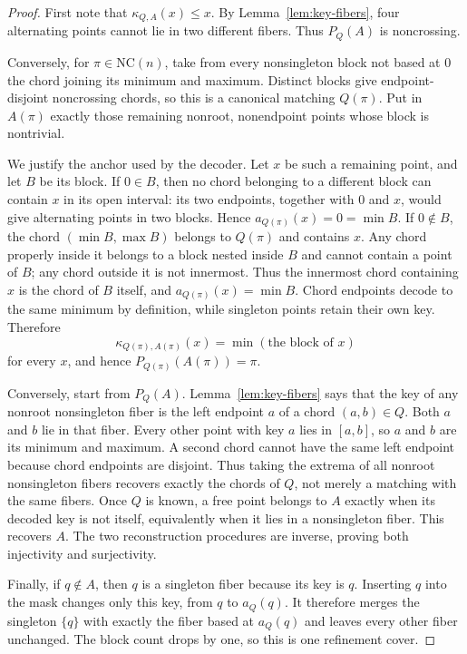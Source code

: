 \documentclass[12pt]{article}
\newcommand{\NC}{\mathrm{NC}}
\begin{document}
\begin{proof}
First note that $\kappa_{Q,A}(x)\leq x$.  By
Lemma~\ref{lem:key-fibers}, four alternating points cannot lie in two
different fibers.  Thus $P_Q(A)$ is noncrossing.

Conversely, for $\pi\in\NC(n)$, take from every nonsingleton block not based
at $0$ the chord joining its minimum and maximum.  Distinct blocks give
endpoint-disjoint noncrossing chords, so this is a canonical matching
$Q(\pi)$.  Put in $A(\pi)$ exactly those remaining nonroot, nonendpoint
points whose block is nontrivial.

We justify the anchor used by the decoder.  Let $x$ be such a remaining
point, and let $B$ be its block.  If $0\in B$, then no chord belonging to a
different block can contain $x$ in its open interval: its two endpoints,
together with $0$ and $x$, would give alternating points in two blocks.
Hence $a_{Q(\pi)}(x)=0=\min B$.  If $0\notin B$, the chord
$(\min B,\max B)$ belongs to $Q(\pi)$ and contains $x$.  Any chord properly
inside it belongs to a block nested inside $B$ and cannot contain a point of
$B$; any chord outside it is not innermost.  Thus the innermost chord
containing $x$ is the chord of $B$ itself, and
$a_{Q(\pi)}(x)=\min B$.  Chord endpoints decode to the same minimum by
definition, while singleton points retain their own key.  Therefore
\[
 \kappa_{Q(\pi),A(\pi)}(x)=\min(\text{the block of }x)
\]
for every $x$, and hence $P_{Q(\pi)}(A(\pi))=\pi$.

Conversely, start from $P_Q(A)$.  Lemma~\ref{lem:key-fibers} says that the key
of any nonroot nonsingleton fiber is the left endpoint $a$ of a chord
$(a,b)\in Q$.  Both $a$ and $b$ lie in that fiber.  Every other point with key
$a$ lies in $[a,b]$, so $a$ and $b$ are its minimum and maximum.  A second
chord cannot have the same left endpoint because chord endpoints are
disjoint.  Thus taking the extrema of all nonroot nonsingleton fibers recovers
exactly the chords of $Q$, not merely a matching with the same fibers.  Once
$Q$ is known, a free point belongs to $A$ exactly when its decoded key is not
itself, equivalently when it lies in a nonsingleton fiber.  This recovers $A$.
The two reconstruction procedures are inverse, proving both injectivity and
surjectivity.

Finally, if $q\notin A$, then $q$ is a singleton fiber because its key is
$q$.  Inserting $q$ into the mask changes only this key, from $q$ to
$a_Q(q)$.  It therefore merges the singleton $\{q\}$ with exactly the fiber
based at $a_Q(q)$ and leaves every other fiber unchanged.  The block count
drops by one, so this is one refinement cover.
\end{proof}
\end{document}
